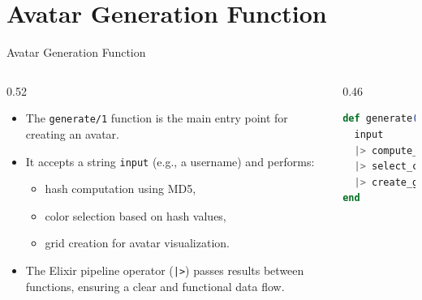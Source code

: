 \documentclass[aspectratio=169, table]{beamer}
\begin{document}
\section{Avatar Generation Function}
\begin{frame}[fragile]{Avatar Generation Function}
\vspace{10pt}
\begin{columns}[T,totalwidth=\textwidth]
  \begin{column}{0.52\textwidth}
    \small
    \begin{itemize}
      \item The \texttt{generate/1} function is the main entry point for creating an avatar.
      \item It accepts a string \texttt{input} (e.g., a username) and performs:
      \begin{itemize}
        \item hash computation using MD5,
        \item color selection based on hash values,
        \item grid creation for avatar visualization.
      \end{itemize}
      \item The Elixir pipeline operator (\texttt{|>}) passes results between functions,
      ensuring a clear and functional data flow.
    \end{itemize}
  \end{column}

  \begin{column}{0.46\textwidth}
    \begin{lstlisting}[language=Elixir, 
      caption={Main function for generating avatars}, 
      basicstyle=\ttfamily\small]
def generate(input) do
  input
  |> compute_hash
  |> select_color
  |> create_grid
end
    \end{lstlisting}
  \end{column}
\end{columns}
\end{frame}
\end{document}
